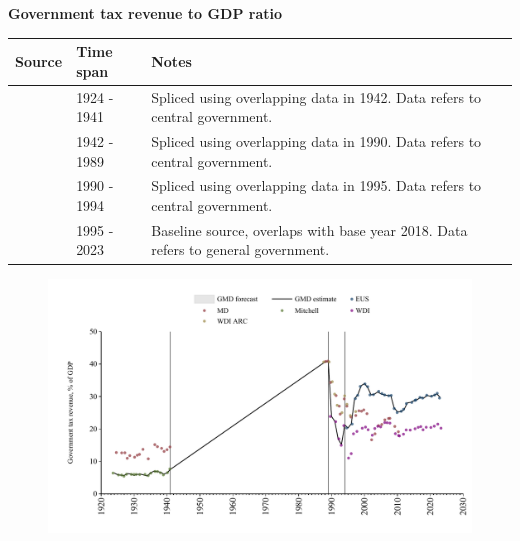 \documentclass[12pt,a4paper,landscape]{article}
\begin{document}
\begin{adjustbox}{max totalsize={\paperwidth}{\paperheight},center}
\begin{minipage}[t][\textheight][t]{\textwidth}
\vspace*{0.5cm}
{}
\begin{center}
{\Large\bfseries Government tax revenue to GDP ratio}
\end{center}
\vspace{0.5cm}
\begin{table}[H]
\centering
\small
\begin{tabular}{|l|l|l|}
\hline
\textbf{Source} & \textbf{Time span} & \textbf{Notes} \\
\hline
\rowcolor{white}\cite{Mitchell}& 1924 - 1941 &Spliced using overlapping data in 1942. Data refers to central government.\\
\rowcolor{lightgray}\cite{WDI_ARC}& 1942 - 1989 &Spliced using overlapping data in 1990. Data refers to central government.\\
\rowcolor{white}\cite{WDI}& 1990 - 1994 &Spliced using overlapping data in 1995. Data refers to central government.\\
\rowcolor{lightgray}\cite{EUS}& 1995 - 2023 &Baseline source, overlaps with base year 2018. Data refers to general government.\\
\hline
\end{tabular}
\end{table}
\begin{figure}[H]
\centering
\includegraphics[width=\textwidth,height=0.6\textheight,keepaspectratio]{graphs/BGR_govtax_GDP.pdf}
\end{figure}
\end{minipage}
\end{adjustbox}
\end{document}

